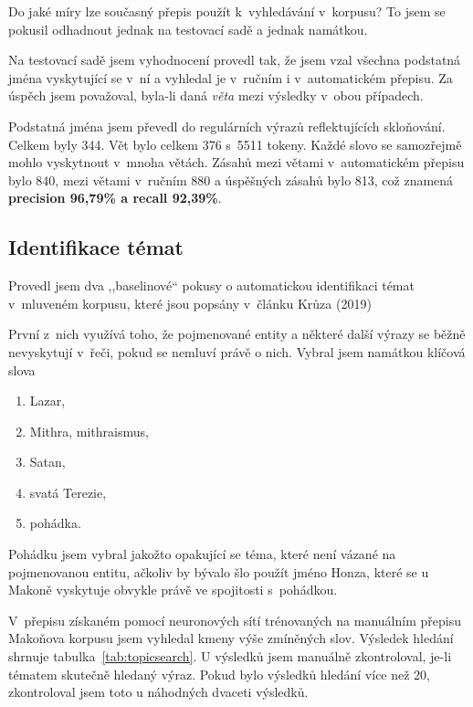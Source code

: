 Do jaké míry lze současný přepis použít k~vyhledávání v~korpusu? To jsem se
pokusil odhadnout jednak na testovací sadě a jednak namátkou.

Na testovací sadě jsem vyhodnocení provedl tak, že jsem vzal všechna podstatná
jména vyskytující se v~ní a vyhledal je v~ručním i v~automatickém přepisu.
Za úspěch jsem považoval, byla-li daná {\em věta} mezi výsledky v~obou
případech.

Podstatná jména jsem převedl do regulárních výrazů reflektujících skloňování.
Celkem byly 344. Vět bylo celkem 376 s~5511 tokeny. Každé slovo se samozřejmě
mohlo vyskytnout v~mnoha větách. Zásahů mezi větami v~automatickém přepisu bylo
840, mezi větami v~ručním 880 a úspěšných zásahů bylo 813, což znamená \textbf{precision
96,79\% a recall 92,39\%}.

\subsection{Identifikace témat}
\label{ssec:data:topicsearch}

Provedl jsem dva ,,baselinové`` pokusy o automatickou identifikaci témat
v~mluveném korpusu, které jsou popsány v~článku Krůza (2019)\cite{kruza2019spoken}

První z~nich využívá toho, že pojmenované entity a některé další výrazy se běžně
nevyskytují v~řeči, pokud se nemluví právě o nich. Vybral jsem namátkou klíčová
slova
\begin{enumerate}
\item{Lazar,}
\item{Mithra, mithraismus,}
\item{Satan,}
\item{svatá Terezie,}
\item{pohádka.}
\end{enumerate}

Pohádku jsem vybral jakožto opakující se téma, které není vázané na pojmenovanou
entitu, ačkoliv by bývalo šlo použít jméno Honza, které se u Makoně vyskytuje
obvykle právě ve spojitosti s~pohádkou.

V~přepisu %
získaném pomocí neuronových sítí trénovaných na manuálním přepisu Makoňova korpusu jsem vyhledal kmeny
výše zmíněných slov. Výsledek hledání shrnuje tabulka~\ref{tab:topicsearch}.
U výsledků jsem manuálně zkontroloval, je-li tématem skutečně hledaný výraz.
Pokud bylo výsledků hledání více než 20, zkontroloval jsem toto u náhodných
dvaceti výsledků.

